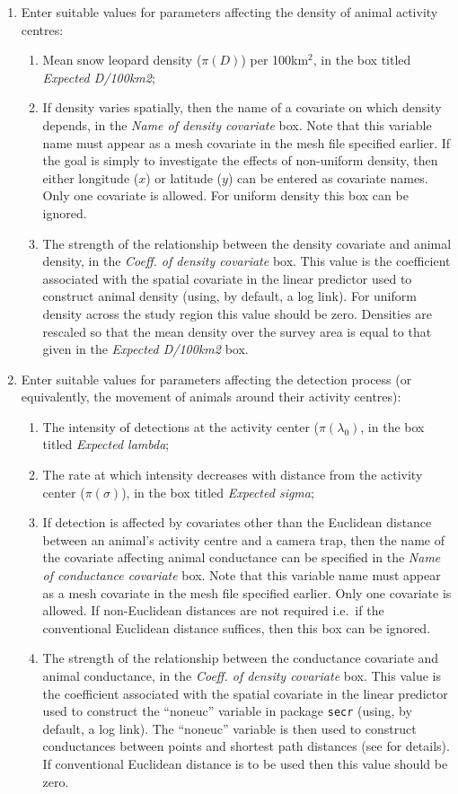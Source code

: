 \documentclass[a4paper,11pt, draft]{article} %
\begin{document}
\begin{enumerate}
\item Enter suitable values for parameters affecting the density of animal activity centres:
\begin{enumerate}
\item Mean snow leopard density ($\pi(D)$) per 100km$^2$, in the box titled \textit{Expected D/100km2};
\item If density varies spatially, then the name of a covariate on which density depends, in the {\it Name of density covariate} box. Note that this variable name must appear as a mesh covariate in the mesh file specified earlier. If the goal is simply to investigate the effects of non-uniform density, then either longitude ($x$) or latitude ($y$) can be entered as covariate names. Only one covariate is allowed. For uniform density this box can be ignored.
\item The strength of the relationship between the density covariate and animal density, in the {\it Coeff. of density covariate} box. This value is the coefficient associated with the spatial covariate in the linear predictor used to construct animal density (using, by default, a log link). For uniform density across the study region this value should be zero. Densities are rescaled so that the mean density over the survey area is equal to that given in the \textit{Expected D/100km2} box.
\end{enumerate}
\item Enter suitable values for parameters affecting the detection process (or equivalently, the movement of animals around their activity centres):
\begin{enumerate}
\item The intensity of detections at the activity center ($\pi(\lambda_0)$, in the box titled \textit{Expected lambda};
\item The rate at which intensity decreases with distance from the activity center ($\pi(\sigma)$), in the box titled \textit{Expected sigma};
\item If detection is affected by covariates other than the Euclidean distance between an animal's activity centre and a camera trap, then the name of the covariate affecting animal conductance can be specified in the {\it Name of conductance covariate} box. Note that this variable name must appear as a mesh covariate in the mesh file specified earlier. Only one covariate is allowed. If non-Euclidean distances are not required i.e.\ if the conventional Euclidean distance suffices, then this box can be ignored.
\item The strength of the relationship between the conductance covariate and animal conductance, in the {\it Coeff. of density covariate} box. This value is the coefficient associated with the spatial covariate in the linear predictor used to construct the ``noneuc'' variable in package \texttt{secr} (using, by default, a log link). The ``noneuc'' variable is then used to construct conductances between points and shortest path distances (see \cite{Sutherland2015} for details). If conventional Euclidean distance is to be used then this value should be zero. 

\end{enumerate}
\end{enumerate}
\end{document}
